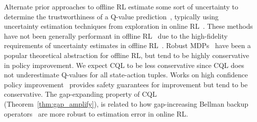 Alternate prior approaches to offline RL estimate some sort of uncertainty to determine the trustworthiness of a Q-value prediction~\citep{kumar2019stabilizing,agarwal2019optimistic,levine2020offline}, typically using uncertainty estimation techniques from exploration in online RL~\citep{osband2016deep,jaksch2010near,osband2017posterior,burda2018exploration}. These methods have not been generally performant in offline RL~\citep{fujimoto2018off,kumar2019stabilizing,levine2020offline} due to the high-fidelity requirements of uncertainty estimates in offline RL~\citep{levine2020offline}. Robust MDPs~\citep{iyengar2005robust,ghavamzadeh2016safe,tamar2014scaling,nilim2004robustness} have been a popular theoretical abstraction for offline RL, but tend to be highly conservative in policy improvement. We expect CQL to be less conservative since CQL does not underestimate Q-values for all state-action tuples. Works on high confidence policy improvement~\citep{thomas2015high} provides safety guarantees for improvement but tend to be conservative. The gap-expanding property of CQL (Theorem~\ref{thm:gap_amplify}), is related to how gap-increasing Bellman backup operators~\citep{bellemare2016increasing,lu2018general} are more robust to estimation error in online RL. 


